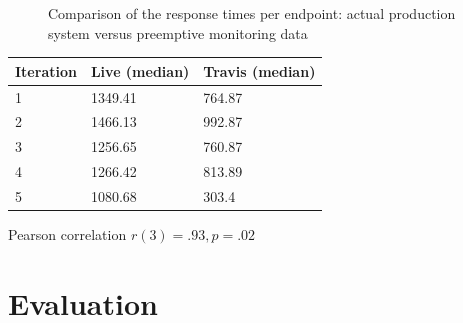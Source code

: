 \documentclass{sig-alternate-05-2015}
\begin{document}
\begin{figure}
	\centering
	\quad
	\caption{Comparison of the response times per endpoint: actual production system versus preemptive monitoring data}
	\label{fig:preemptive}
\end{figure}


\begin{table}[h]
	\begin{tabular}{lll}
		\toprule
		Iteration & \bfseries Live (median) & \bfseries Travis (median)\\
		\midrule
		1 & 1349.41 & 764.87\\ 
		2 & 1466.13 & 992.87\\
		3 & 1256.65 & 760.87\\
		4 & 1266.42 & 813.89\\
		5 & 1080.68 & 303.4\\
		\bottomrule
	\end{tabular}
\end{table}

Pearson correlation $r(3)=.93, p=.02$

\section{Evaluation}
\label{sec:evaluation}
\end{document}
